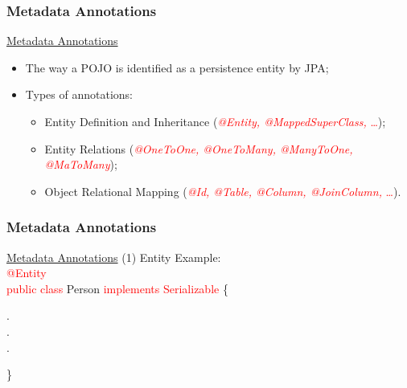 \documentclass[xcolor=x11names,compress]{beamer}
\renewcommand{\(}{\begin{columns}}
\renewcommand{\)}{\end{columns}}
\newcommand{\<}[1]{\begin{column}{#1}}
\renewcommand{\>}{\end{column}}
\begin{document}
\subsubsection{Metadata Annotations}
\begin{frame}{\underline{Metadata Annotations}}

\begin{itemize}
\itemsep 12pt
\justifying

\item The way a POJO is identified as a persistence entity by JPA;

\item Types of annotations:

\begin{itemize}
\itemsep 12pt
\justifying

\item Entity Definition and Inheritance (\textcolor{red}{\textit{@Entity, @MappedSuperClass,} \ldots});

\item Entity Relations (\textcolor{red}{\textit{@OneToOne, @OneToMany, @ManyToOne, @MaToMany}});

\item Object Relational Mapping (\textcolor{red}{\textit{@Id, @Table, @Column, @JoinColumn,} \ldots}).
\end{itemize}
\end{itemize}
\end{frame}

\subsubsection{Metadata Annotations}
\begin{frame}{\underline{Metadata Annotations} (1)}
Entity Example: 
\\[6mm]
\textcolor{red}{@Entity}\\
\textcolor{red}{public class} Person \textcolor{red}{implements Serializable} \{ \\
\begin{center}
. \\
. \\
.  \\
\end{center}
\} 
\end{frame}
\end{document}
